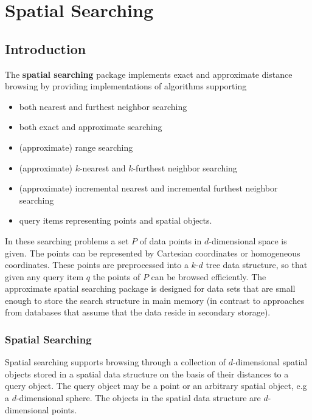 \chapter{Spatial Searching}

\section{Introduction}

The {\bf spatial searching} package implements
exact and approximate distance browsing
by providing implementations of algorithms supporting

\begin{itemize} 

\item
both nearest and furthest neighbor searching

\item
both exact and approximate searching

\item
(approximate) range searching

\item 
(approximate) $k$-nearest and $k$-furthest neighbor searching

\item 
(approximate) incremental nearest and incremental furthest neighbor searching

\item
query items representing points and spatial objects.

\end{itemize}

In these searching problems a set $P$ of data points in $d$-dimensional
space is given.
The points can be represented by Cartesian coordinates or homogeneous coordinates.
These points are preprocessed into a $k$-$d$ tree data structure, so that given
any query item $q$ the points of $P$ can be browsed efficiently.
The approximate spatial searching package is designed for data sets that are small enough to store
the search structure in main memory (in contrast to approaches
from databases that assume that the data reside in secondary storage).

\subsection{Spatial Searching}

Spatial searching supports browsing through a collection of $d$-dimensional spatial objects
stored in a spatial data structure on the basis of their distances to a
query object. The query object may be a point or an arbitrary spatial object, e.g a 
$d$-dimensional sphere. The objects in the spatial data structure are $d$-dimensional points.

